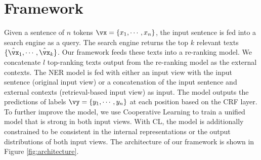 \documentclass[11pt,a4paper]{article}
\begin{document}
\section{Framework}
Given a sentence of $n$ tokens $\vx = \{x_1, \cdots, x_n\}$, the input sentence is fed into a search engine as a query. The search engine returns the top $k$ relevant texts $\{\hat{\vx}_1, \cdots, \hat{\vx}_k\}$. Our framework feeds these texts into a re-ranking model. We concatenate $l$ top-ranking texts output from the re-ranking model as the external contexts. The NER model is fed with either an input view with the input sentence (original input view) or a concatenation of the input sentence and external contexts (retrieval-based input view) as input. The model outputs the predictions of labels $\vy = \{y_1, \cdots, y_n\}$ at each position based on the CRF layer. To further improve the model, we use Cooperative Learning to train a unified model that is strong in both input views. With CL, the model is additionally constrained to be consistent in the internal representations or the output distributions of both input views. The architecture of our framework is shown in Figure \ref{fig:architecture}.
\end{document}
